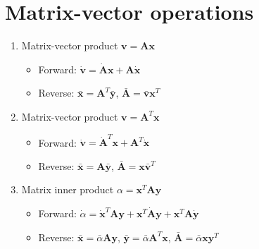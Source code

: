 \documentclass{article}
\begin{document}
    \section{Matrix-vector operations}\label{sec:matrix-vector-operations}

    \begin{enumerate}
        \item Matrix-vector product $\mathbf{v} = \mathbf{A} \mathbf{x}$
        \begin{itemize}
            \item Forward: $\dot{\mathbf{v}} = \dot{\mathbf{A}} \mathbf{x} + \mathbf{A} \dot{\mathbf{x}}$
            \item Reverse: $\bar{\mathbf{x}} = \mathbf{A}^{T} \bar{\mathbf{y}}$, $\bar{\mathbf{A}} = \bar{\mathbf{v}} \mathbf{x}^{T}$
        \end{itemize}

        \item Matrix-vector product $\mathbf{v} = \mathbf{A}^{T} \mathbf{x}$
        \begin{itemize}
            \item Forward: $\dot{\mathbf{v}} = \dot{\mathbf{A}}^{T} \mathbf{x} + \mathbf{A}^{T} \dot{\mathbf{x}}$
            \item Reverse: $\bar{\mathbf{x}} = \mathbf{A} \bar{\mathbf{y}}$, $\bar{\mathbf{A}} = \mathbf{x} \bar{\mathbf{v}}^{T}$
        \end{itemize}

        \item Matrix inner product $\alpha = \mathbf{x}^{T} \mathbf{A} \mathbf{y}$
        \begin{itemize}
            \item Forward: $\dot{\alpha} = \dot{\mathbf{x}}^{T} \mathbf{A} \mathbf{y} + \mathbf{x}^{T} \dot{\mathbf{A}} \mathbf{y} + \mathbf{x}^{T} \mathbf{A} \dot{\mathbf{y}}$
            \item Reverse: $\bar{\mathbf{x}} = \bar{\alpha} \mathbf{A} \mathbf{y}$, $\bar{\mathbf{y}} = \bar{\alpha} \mathbf{A}^{T} \mathbf{x}$, $\bar{\mathbf{A}} = \bar{\alpha} \mathbf{x} \mathbf{y}^{T}$
        \end{itemize}


    \end{enumerate}
\end{document}
